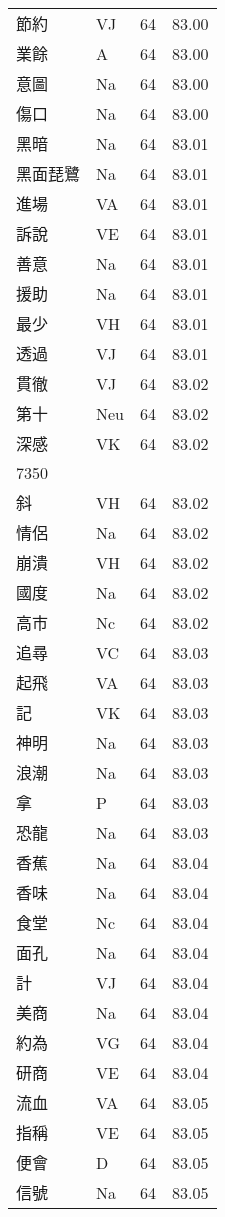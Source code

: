 \documentclass[twocolumn]{book}
\begin{document}
\begin{supertabular}{llrr}
節約 & VJ & 64 &  83.00\\
業餘 & A & 64 &  83.00\\
意圖 & Na & 64 &  83.00\\
傷口 & Na & 64 &  83.00\\
黑暗 & Na & 64 &  83.01\\
黑面琵鷺 & Na & 64 &  83.01\\
進場 & VA & 64 &  83.01\\
訴說 & VE & 64 &  83.01\\
善意 & Na & 64 &  83.01\\
援助 & Na & 64 &  83.01\\
最少 & VH & 64 &  83.01\\
透過 & VJ & 64 &  83.01\\
貫徹 & VJ & 64 &  83.02\\
第十 & Neu & 64 &  83.02\\
深感 & VK & 64 &  83.02\\
7350\\
斜 & VH & 64 &  83.02\\
情侶 & Na & 64 &  83.02\\
崩潰 & VH & 64 &  83.02\\
國度 & Na & 64 &  83.02\\
高市 & Nc & 64 &  83.02\\
追尋 & VC & 64 &  83.03\\
起飛 & VA & 64 &  83.03\\
記 & VK & 64 &  83.03\\
神明 & Na & 64 &  83.03\\
浪潮 & Na & 64 &  83.03\\
拿 & P & 64 &  83.03\\
恐龍 & Na & 64 &  83.03\\
香蕉 & Na & 64 &  83.04\\
香味 & Na & 64 &  83.04\\
食堂 & Nc & 64 &  83.04\\
面孔 & Na & 64 &  83.04\\
計 & VJ & 64 &  83.04\\
美商 & Na & 64 &  83.04\\
約為 & VG & 64 &  83.04\\
研商 & VE & 64 &  83.04\\
流血 & VA & 64 &  83.05\\
指稱 & VE & 64 &  83.05\\
便會 & D & 64 &  83.05\\
信號 & Na & 64 &  83.05\\

\end{supertabular}
\end{document}
